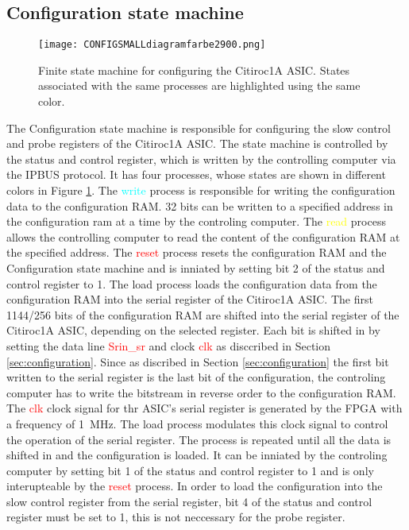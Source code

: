 \subsection{Configuration state machine}
\begin{figure}[H]
    \centering
    \texttt{[image: CONFIGSMALLdiagramfarbe2900.png]}%
    \caption{Finite state machine for configuring the Citiroc1A ASIC.
    States associated with the same processes are highlighted using the same color.}
    \label{fig:Configuration_state_machine}
\end{figure}
The Configuration state machine is responsible for configuring the slow control and probe registers of the Citiroc1A ASIC.
The state machine is controlled by the status and control register, which is written by the controlling computer via the IPBUS protocol.
It has four processes, whose states are shown in different colors in Figure \ref{fig:Configuration_state_machine}.
\newline
The \textcolor{cyan}{write} process is responsible for writing the configuration data to the configuration RAM.
32 bits can be written to a specified address in the configuration ram at a time by the controling computer.
\newline
The \textcolor{yellow}{read} process allows the controlling computer to read the content of the configuration RAM at the specified address.
\newline
The \textcolor{red}{reset} process resets the configuration RAM and the Configuration state machine and is inniated by setting bit 2 of the status and control register to 1.
\newline
The \textcolor{VioletRed}{load} process loads the configuration data from the configuration RAM into the serial register of the Citiroc1A ASIC. 
The first 1144/256 bits of the configuration RAM are shifted into the serial register of the Citiroc1A ASIC, depending on the selected register.
Each bit is shifted in by setting the data line \textcolor{red}{Srin\_sr} and clock \textcolor{red}{clk} as disccribed in Section \ref{sec:configuration}.
Since as discribed in Section \ref{sec:configuration} the first bit written to the serial register is the last bit of the configuration, the controling computer has to write the bitstream in reverse order to the configuration RAM.
\newline
The \textcolor{red}{clk} clock signal for thr ASIC's serial register is generated by the FPGA with a frequency of \SI{1}{\mega\hertz}.
The \textcolor{VioletRed}{load} process modulates this clock signal to control the operation of the serial register.
\newline
The process is repeated until all the data is shifted in and the configuration is loaded.
It can be inniated by the controling computer by setting bit 1 of the status and control register to 1 and is only interupteable by the \textcolor{red}{reset} process.
\newline
In order to load the configuration into the slow control register from the serial register, bit 4 of the status and control register must be set to 1, this is not neccessary for the probe register.


